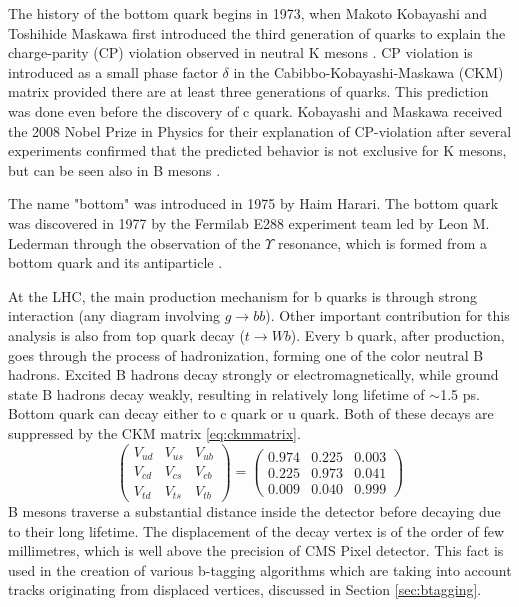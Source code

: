 The history of the bottom quark begins in 1973, when Makoto Kobayashi and Toshihide Maskawa first introduced the third generation of quarks to explain the charge-parity (CP) violation observed in neutral K mesons \cite{Kobayashi:1973fv}. CP violation is introduced as a small phase factor $\delta$ in the Cabibbo-Kobayashi-Maskawa (CKM) matrix provided there are at least three generations of quarks. This prediction was done even before the discovery of c quark. Kobayashi and Maskawa received the 2008 Nobel Prize in Physics for their explanation of CP-violation after several experiments confirmed that the predicted behavior is not exclusive for K mesons, but can be seen also in B mesons \cite{Aubert:2001sp,Abe:2001xe}.
\par The name "bottom" was introduced in 1975 by Haim Harari. The bottom quark was discovered in 1977 by the Fermilab E288 experiment team led by Leon M. Lederman through the observation of the $\Upsilon$ resonance, which is formed from a bottom quark and its antiparticle \cite{PhysRevLett.39.252}.  
\par At the LHC, the main production mechanism for b quarks is through strong interaction (any diagram involving $g\rightarrow bb$). Other important contribution for this analysis is also from top quark decay ($t\rightarrow Wb$). Every b quark, after production, goes through the process of hadronization, forming one of the color neutral B hadrons. Excited B hadrons decay strongly or electromagnetically, while ground state B hadrons decay weakly, resulting in relatively long lifetime of $\sim$1.5 ps. Bottom quark can decay either to c quark or u quark. Both of these decays are suppressed by the CKM matrix \ref{eq:ckmmatrix}.
\begin{equation} 
\begin{pmatrix}
V_{ud} & V_{us} & V_{ub} \\
V_{cd} & V_{cs} & V_{cb} \\
V_{td} & V_{ts} & V_{tb} 
\end{pmatrix} 
= \begin{pmatrix}
0.974 & 0.225 & 0.003 \\
0.225 & 0.973 & 0.041 \\
0.009 & 0.040 & 0.999 
\end{pmatrix} 
\label{eq:ckmmatrix} 
\end{equation}
B mesons traverse a substantial distance inside the detector before decaying due to their long lifetime. The displacement of the decay vertex is of the order of few millimetres, which is well above the precision of CMS Pixel detector. This fact is used in the creation of various b-tagging algorithms which are taking into account tracks originating from displaced vertices, discussed in Section \ref{sec:btagging}.




